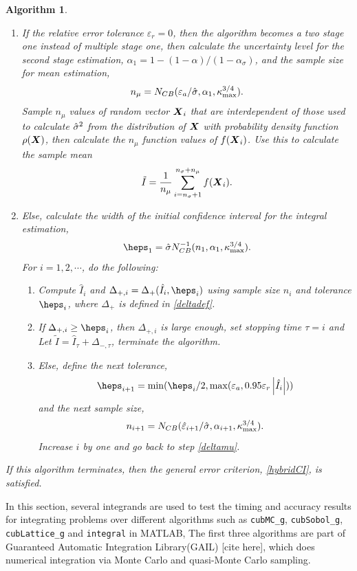 \documentclass{iitthesis}
\newtheorem{algorithm}[theorem]{Algorithm}
\begin{document}
\begin{algorithm}
\begin{enumerate}
\item If the relative error tolerance $\varepsilon_r=0$, then the algorithm becomes a two stage one instead of multiple stage one, then calculate the uncertainty level for the second stage estimation, $\alpha_1 = 1-(1-\alpha)/(1-\alpha_\sigma)$, and the sample size for mean estimation, $$n_{\mu} = N_{CB}(\varepsilon_a/\hat{\sigma},\alpha_1,\kappa_{\max}^{3/4}).$$ Sample $n_\mu$ values of random vector $\boldsymbol{X}_i$ that are interdependent of those used to calculate $\hat{\sigma}^2$ from the distribution of $\boldsymbol{X}$ with probability density function $\rho(\boldsymbol{X})$, then calculate the $n_\mu$ function values of $f(\boldsymbol{X}_i)$. Use this to calculate the sample mean 
\begin{align}\label{hatIcubMCg}
\tilde{I}= \frac{1}{n_\mu}\sum_{i = n_\sigma+1}^{n_\sigma+n_\mu}f(\boldsymbol{X}_i).
\end{align}
\item Else, calculate the width of the initial confidence interval for the integral estimation,
\begin{align}\label{eps1def}
\heps_1=\hsigma N_{CB}^{-1}(n_1,\alpha_1,\kappa_{\max}^{3/4}).
\end{align}
For $i = 1,2,\cdots$, do the following:
\begin{enumerate}
\item  \label{deltamu}Compute $\hat{I}_i$ and $\Delta_{+,i}=\Delta_{+}(\hat{I}_i,\heps_i)$ using sample size $n_i$ and tolerance $\heps_i$, where $\Delta_{+}$ is defined in \eqref{deltadef}.
\item If $\Delta_{+,i} \geq  \heps_i$, then $\Delta_{+,i}$ is large enough, set stopping time $\tau = i$ and Let $\tilde{I} = \hat{I}_{\tau}+\Delta_{-, \tau}$, terminate the algorithm.
\item Else, define the next tolerance, $$\heps_{i+1} = \min(\heps_i/2, \max(\varepsilon_a,0.95\varepsilon_r\abs{\hat{I}_i}))$$ and the next sample size, $$n_{i+1} = N_{CB}(\hat{\varepsilon}_{i+1}/\hat{\sigma},\alpha_{i+1},\kappa_{\max}^{3/4}).$$ Increase $i$ by one and go back to step \ref{deltamu}. 
\end{enumerate}
\end{enumerate}
If this algorithm terminates, then the general error criterion, \eqref{hybridCI}, is satisfied.
\end{algorithm}


In this section, several integrands are used to test the timing and accuracy results for integrating problems over different algorithms such as {\tt cubMC\_g}, {\tt cubSobol\_g}, {\tt cubLattice\_g} and {\tt integral} in MATLAB, The first three algorithms are part of Guaranteed Automatic Integration Library(GAIL) [cite here], which does numerical integration via Monte Carlo and quasi-Monte Carlo sampling.
\end{document}
